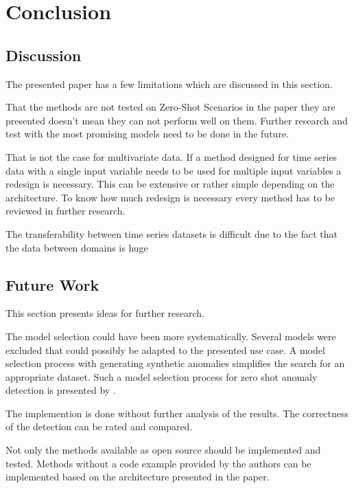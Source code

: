 \section{Conclusion}\label{conclusion}
\subsection{Discussion}
The presented paper has a few limitations which are discussed in this section.

That the methods are not tested on Zero-Shot Scenarios in the paper they are presented doesn't mean they can not perform well on them.  Further research and test with the most promising models need to be done in the future.

That is not the case for multivariate data. If a method designed for time series data with a single input variable needs to be used for multiple input variables a redesign is necessary. This can be extensive or rather simple depending on the architecture. To know how much redesign is necessary every method has to be reviewed in further research.


The transferability between time series datasets is difficult due to the fact that the data between domains is huge 

\subsection{Future Work}
This section presents ideas for further research.

The model selection could have been more systematically. Several models were excluded that could possibly be adapted to the presented use case. A model selection process with generating synthetic anomalies simplifies the search for an appropriate dataset. Such a model selection process for zero shot anomaly detection is presented by .

The implemention is done without further analysis of the results. The correctness of the detection can be rated and compared.

%
Not only the methods available as open source should be implemented and tested. Methods without a code example provided by the authors can be implemented based on the architecture presented in the paper.

